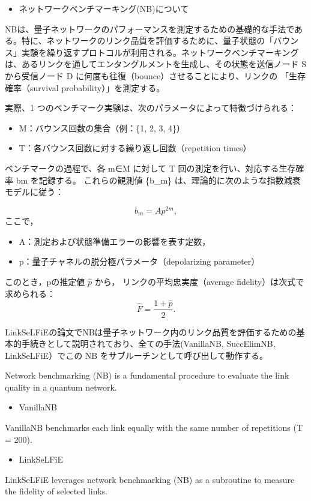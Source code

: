 \documentclass[technicalreport,dvipdfmx]{ieicej}
\begin{document}
\begin{itemize}
\item ネットワークベンチマーキング(NB)について
\end{itemize}
NBは、量子ネットワークのパフォーマンスを測定するための基礎的な手法であ
る。特に、ネットワークのリンク品質を評価するために、量子状態の「バウン
ス」実験を繰り返すプロトコルが利用される。ネットワークベンチマーキング
は、あるリンクを通してエンタングルメントを生成し、その状態を送信ノード
S から受信ノード D に何度も往復（bounce）させることにより、リンクの
「生存確率（survival probability）」を測定する。

実際、1 つのベンチマーク実験は、次のパラメータによって特徴づけられる：
\begin{itemize}
\item M：バウンス回数の集合（例：\{1, 2, 3, 4\}）
\item T：各バウンス回数に対する繰り返し回数（repetition times）
\end{itemize}
ベンチマークの過程で、各 m∈M に対して T 回の測定を行い、対応する生存確
率 bm を記録する。
これらの観測値 \{b\_m\} は、理論的に次のような指数減衰モデルに従う：


\[
b_m = A p^{2m},
\]
ここで，

\begin{itemize}
\item A：測定および状態準備エラーの影響を表す定数，
\item p：量子チャネルの脱分極パラメータ（depolarizing parameter）
\end{itemize}


このとき，pの推定値 \(\hat{p}\) から，
リンクの平均忠実度（average fidelity）は次式で求められる：
\[
\hat{F} = \frac{1 + \hat{p}}{2}.
\]

LinkSeLFiEの論文でNBは量子ネットワーク内のリンク品質を評価するための基
本的手続きとして説明されており、全ての手法(VanillaNB, SuccElimNB,
LinkSeLFiE）でこの NB をサブルーチンとして呼び出して動作する。

Network benchmarking (NB) is a fundamental procedure to evaluate the link quality in a quantum network.

\begin{itemize}
\item VanillaNB
\end{itemize}
VanillaNB benchmarks each link equally with the same number of repetitions (T = 200).
\begin{itemize}
\item LinkSeLFiE
\end{itemize}
LinkSeLFiE leverages network benchmarking (NB) as a subroutine to measure the fidelity of selected links.
\end{document}
